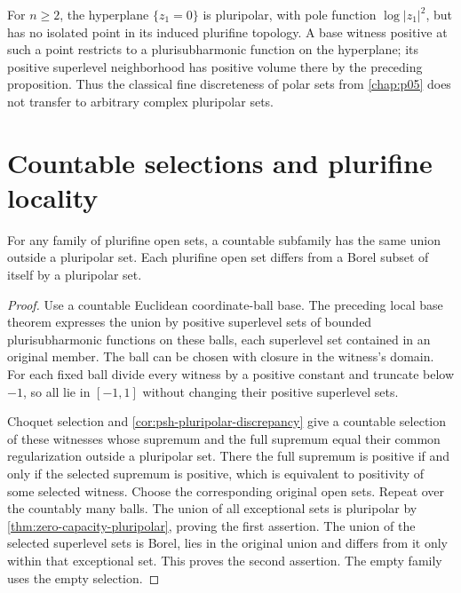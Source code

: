\begin{example}\label{ex:pluripolar-hyperplane-not-discrete}
For $n\ge2$, the hyperplane $\{z_1=0\}$ is pluripolar, with pole function $\log|z_1|^2$, but has no isolated point in its induced plurifine topology. A base witness positive at such a point restricts to a plurisubharmonic function on the hyperplane; its positive superlevel neighborhood has positive volume there by the preceding proposition. Thus the classical fine discreteness of polar sets from \cref{chap:p05} does not transfer to arbitrary complex pluripolar sets.
\end{example}

\section{Countable selections and plurifine locality}
\label{sec:plurifine-selection-locality}

\begin{theorem}\label{thm:plurifine-quasi-lindelof}
For any family of plurifine open sets, a countable subfamily has the same union outside a pluripolar set. Each plurifine open set differs from a Borel subset of itself by a pluripolar set.
\end{theorem}
\begin{proof}
Use a countable Euclidean coordinate-ball base. The preceding local base theorem expresses the union by positive superlevel sets of bounded plurisubharmonic functions on these balls, each superlevel set contained in an original member. The ball can be chosen with closure in the witness's domain. For each fixed ball divide every witness by a positive constant and truncate below $-1$, so all lie in $[-1,1]$ without changing their positive superlevel sets.

Choquet selection and \cref{cor:psh-pluripolar-discrepancy} give a countable selection of these witnesses whose supremum and the full supremum equal their common regularization outside a pluripolar set. There the full supremum is positive if and only if the selected supremum is positive, which is equivalent to positivity of some selected witness. Choose the corresponding original open sets. Repeat over the countably many balls. The union of all exceptional sets is pluripolar by \cref{thm:zero-capacity-pluripolar}, proving the first assertion. The union of the selected superlevel sets is Borel, lies in the original union and differs from it only within that exceptional set. This proves the second assertion. The empty family uses the empty selection.
\end{proof}

